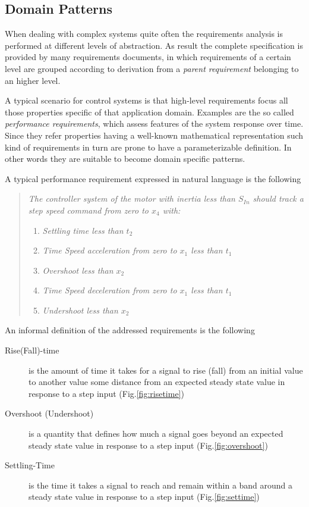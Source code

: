 \subsection{Domain Patterns}
\label{ssec:dompatterns}

When dealing with complex systems quite often the requirements analysis is performed at different levels of abstraction. As result the complete specification is provided by many requirements documents, in which requirements of a certain level are grouped according to derivation from a \textit{parent requirement} belonging to an higher level. 
\par A typical scenario for control systems is that high-level requirements focus all those properties specific of that application domain. Examples are the so called \textit{performance requirements}, which assess features of the system response over time. Since they refer properties having a well-known mathematical representation such kind of requirements in turn are prone to have a parameterizable definition. In other words they are suitable to become domain specific patterns.
\par A typical performance requirement expressed in natural language is the following
\begin{quote}
\label{en:ptreq}
\textit{The controller system of the motor with inertia less than $S_{In}$ should track a step speed command from zero to $x_4$ with:}
\begin{enumerate}
\item \textit{Settling time less than $t_2$}
\item \textit{Time Speed acceleration from zero to $x_1$ less than $t_1$ }
\item \textit{Overshoot less than $x_2$}
\item \textit{Time Speed deceleration from zero to $x_1$ less than $t_1$ }
\item \textit{Undershoot less than $x_2$}
\end{enumerate}
\end{quote} 
An informal definition of the addressed requirements is the following
\begin{description}
\item[Rise(Fall)-time] is the amount of time it takes for a signal to rise (fall) from an initial value to another value some distance from an expected steady state value in response to a step input  (Fig.\ref{fig:risetime})
\item[Overshoot (Undershoot)] is a quantity that defines how much a signal goes beyond an expected steady state value in response to a step input (Fig.\ref{fig:overshoot})
\item[Settling-Time] is the time it takes a signal to reach and remain within a band around a steady state value in response to a step input (Fig.\ref{fig:settime})
\end{description}
